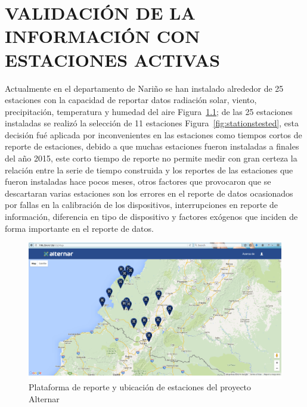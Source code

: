 \chapter{VALIDACIÓN DE LA INFORMACIÓN CON ESTACIONES ACTIVAS}


Actualmente en el departamento de Nariño se han instalado alrededor de 25 estaciones con la capacidad de reportar datos radiación solar, viento, 
precipitación, temperatura y humedad del aire Figura~\ref{fig:stationsalternar}; de las 25 estaciones instaladas se realizó la selección de 11 
estaciones Figura~\ref{fig:stationstested}, esta decisión fué aplicada por inconvenientes en las estaciones como tiempos cortos de reporte de estaciones, debido 
a que muchas estaciones fueron instaladas a finales del año 2015, este corto tiempo de reporte no permite medir con gran certeza la relación entre 
la serie de tiempo construida y los reportes de las estaciones que fueron instaladas hace pocos meses, otros factores que provocaron que se descartaran varias 
estaciones son los errores en el reporte de datos ocasionados por fallas en la calibración de los dispositivos, interrupciones en reporte 
de información, diferencia en tipo de dispositivo y factores exógenos que inciden de forma importante en el reporte de datos. 
\begin{figure}[htb]
  \centering 
  \includegraphics[scale=0.27]{pictures/stationsalternar.png}
  \caption{Plataforma de reporte y ubicación de estaciones del proyecto Alternar}
  \label{fig:stationsalternar}
\end{figure}

